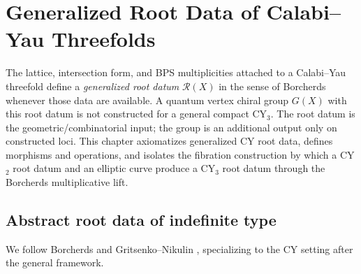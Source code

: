 
\chapter{Generalized Root Data of Calabi--Yau Threefolds}
\label{ch:generalized-root-datum}

The lattice, intersection form, and BPS multiplicities attached to a
Calabi--Yau threefold define a \emph{generalized root datum}
$\mathcal{R}(X)$ in the sense of Borcherds whenever those data are
available. A quantum vertex chiral group $G(X)$ with this root datum is
not constructed for a general compact CY$_3$. The root datum is the
geometric/combinatorial input; the group is an additional output only on
constructed loci. This chapter axiomatizes generalized CY root data,
defines morphisms and operations, and isolates the fibration
construction by which a CY$_2$ root datum and an elliptic curve produce
a CY$_3$ root datum through the Borcherds multiplicative lift.

\section{Abstract root data of indefinite type}
\label{sec:abstract-root-data}

We follow Borcherds \cite{Borcherds1988, Borcherds1998} and Gritsenko--Nikulin \cite{GN1996, GN2002}, specializing to the CY setting after the general framework.

